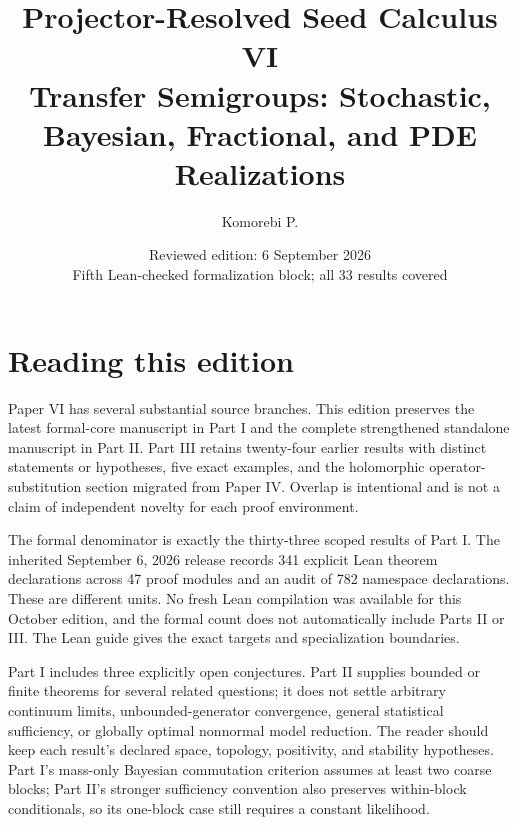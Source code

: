 \documentclass[11pt,letterpaper]{article}
\title{\textbf{Projector-Resolved Seed Calculus VI}\\[0.45em]
\large Transfer Semigroups: Stochastic, Bayesian, Fractional, and PDE Realizations}
\author{Komorebi P.}
\date{Reviewed edition: 6 September 2026\\\small Fifth Lean-checked formalization block; all 33 results covered}
\theoremstyle{plain}
\theoremstyle{plain}
\theoremstyle{plain}
\theoremstyle{definition}
\theoremstyle{definition}
\theoremstyle{definition}
\theoremstyle{definition}
\theoremstyle{definition}
\theoremstyle{remark}
\theoremstyle{remark}
\theoremstyle{remark}
\theoremstyle{remark}
\theoremstyle{remark}
\theoremstyle{remark}
\begin{document}
\KomorebiCover
{}

\section*{Reading this edition}
Paper VI has several substantial source branches. This edition preserves the latest formal-core manuscript in Part I and the complete strengthened standalone manuscript in Part II. Part III retains twenty-four earlier results with distinct statements or hypotheses, five exact examples, and the holomorphic operator-substitution section migrated from Paper IV. Overlap is intentional and is not a claim of independent novelty for each proof environment.

The formal denominator is exactly the thirty-three scoped results of Part I. The inherited September 6, 2026 release records 341 explicit Lean theorem declarations across 47 proof modules and an audit of 782 namespace declarations. These are different units. No fresh Lean compilation was available for this October edition, and the formal count does not automatically include Parts II or III. The Lean guide gives the exact targets and specialization boundaries.

Part I includes three explicitly open conjectures. Part II supplies bounded or finite theorems for several related questions; it does not settle arbitrary continuum limits, unbounded-generator convergence, general statistical sufficiency, or globally optimal nonnormal model reduction. The reader should keep each result's declared space, topology, positivity, and stability hypotheses. Part I's mass-only Bayesian commutation criterion assumes at least two coarse blocks; Part II's stronger sufficiency convention also preserves within-block conditionals, so its one-block case still requires a constant likelihood.
\end{document}

